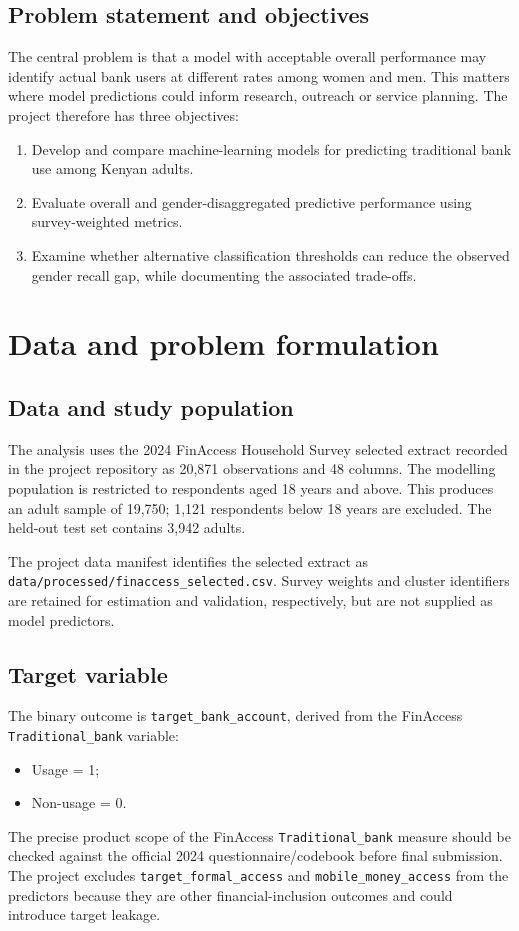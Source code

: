 \documentclass[11pt,a4paper]{article}
\begin{document}
\subsection{Problem statement and objectives}

The central problem is that a model with acceptable overall performance may identify actual bank users at different rates among women and men. This matters where model predictions could inform research, outreach or service planning. The project therefore has three objectives:
\begin{enumerate}[leftmargin=*]
  \item Develop and compare machine-learning models for predicting traditional bank use among Kenyan adults.
  \item Evaluate overall and gender-disaggregated predictive performance using survey-weighted metrics.
  \item Examine whether alternative classification thresholds can reduce the observed gender recall gap, while documenting the associated trade-offs.
\end{enumerate}

\section{Data and problem formulation}

\subsection{Data and study population}

The analysis uses the 2024 FinAccess Household Survey selected extract recorded in the project repository as 20,871 observations and 48 columns. The modelling population is restricted to respondents aged 18 years and above. This produces an adult sample of 19,750; 1,121 respondents below 18 years are excluded. The held-out test set contains 3,942 adults.

The project data manifest identifies the selected extract as \texttt{data/processed/finaccess\_selected.csv}. Survey weights and cluster identifiers are retained for estimation and validation, respectively, but are not supplied as model predictors.

\subsection{Target variable}

The binary outcome is \texttt{target\_bank\_account}, derived from the FinAccess \texttt{Traditional\_bank} variable:
\begin{itemize}[leftmargin=*]
  \item Usage = 1;
  \item Non-usage = 0.
\end{itemize}
The precise product scope of the FinAccess \texttt{Traditional\_bank} measure should be checked against the official 2024 questionnaire/codebook before final submission. The project excludes \texttt{target\_formal\_access} and \texttt{mobile\_money\_access} from the predictors because they are other financial-inclusion outcomes and could introduce target leakage.
\end{document}

